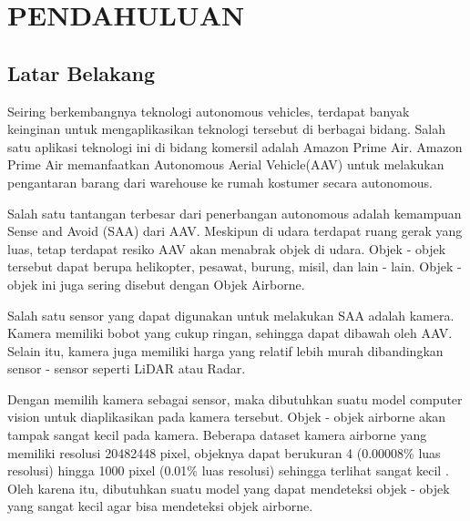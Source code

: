 \section{PENDAHULUAN}
\subsection{Latar Belakang}
    Seiring berkembangnya teknologi autonomous vehicles, terdapat banyak keinginan untuk mengaplikasikan teknologi tersebut di berbagai bidang.
    Salah satu aplikasi teknologi ini di bidang komersil adalah Amazon Prime Air.
    Amazon Prime Air memanfaatkan Autonomous Aerial Vehicle(AAV) untuk melakukan pengantaran barang dari warehouse ke rumah kostumer secara autonomous.

    Salah satu tantangan terbesar dari penerbangan autonomous adalah kemampuan Sense and Avoid (SAA) dari AAV.
    Meskipun di udara terdapat ruang gerak yang luas, tetap terdapat resiko AAV akan menabrak objek di udara.
    Objek - objek tersebut dapat berupa helikopter, pesawat, burung, misil, dan lain - lain.
    Objek - objek ini juga sering disebut dengan Objek Airborne. 

    Salah satu sensor yang dapat digunakan untuk melakukan SAA adalah kamera.
    Kamera memiliki bobot yang cukup ringan, sehingga dapat dibawah oleh AAV.
    Selain itu, kamera juga memiliki harga yang relatif lebih murah dibandingkan sensor - sensor seperti LiDAR atau Radar.
 
    Dengan memilih kamera sebagai sensor, maka dibutuhkan suatu model computer vision untuk diaplikasikan pada kamera tersebut.
    Objek - objek airborne akan tampak sangat kecil pada kamera.
    Beberapa dataset kamera airborne yang memiliki resolusi 20482448 pixel, objeknya dapat berukuran 4 (0.00008\% luas resolusi) hingga 1000 pixel (0.01\% luas resolusi) sehingga terlihat sangat kecil \parencite{aot_docs}.
    Oleh karena itu, dibutuhkan suatu model yang dapat mendeteksi objek - objek yang sangat kecil agar bisa mendeteksi objek airborne.

